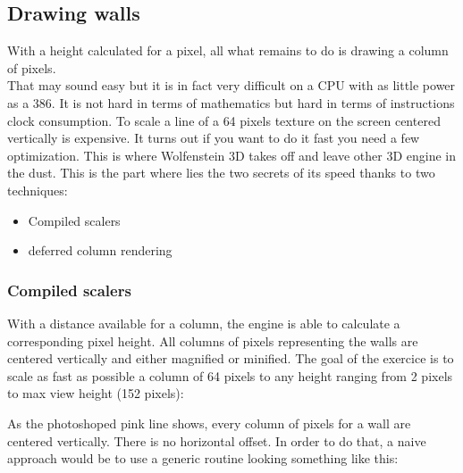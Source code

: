  \begin{minipage}{\textwidth}
 
\centering
\vspace*{0.5cm}
\centering


 \end{minipage}


 \par
 
 \begin{minipage}{\textwidth}
\centering
\vspace*{0.5cm}
\centering
\end{minipage}











\subsection{Drawing walls}
With a height calculated for a pixel, all what remains to do is drawing a column of pixels.\\
That may sound easy but it is in fact very difficult on a CPU with as little power as a 386. It is not hard in terms of mathematics but hard in terms of instructions clock consumption. To scale a line of a 64 pixels texture on the screen centered vertically is expensive. It turns out if you want to do it fast you need a few optimization. This is where Wolfenstein 3D takes off and leave other 3D engine in the dust. This is the part where lies the two secrets of its  speed thanks to two techniques:
\begin{itemize}
\item Compiled scalers
\item deferred column rendering
\end{itemize}
\par

\subsubsection{Compiled scalers}
With a distance available for a column, the engine is able to calculate a corresponding pixel height. All columns of pixels representing the walls are centered vertically and either magnified or minified. The goal of the exercice is to scale as fast as possible a column of 64 pixels to any height ranging from 2 pixels to max view height (152 pixels):\\
\par
 \begin{figure}[H]
\centering
 \end{figure}
\par
As the photoshoped pink line shows, every column of pixels for a wall are centered vertically. There is no horizontal offset. In order to do that, a naive approach would be to use a generic routine looking something like this:\\


